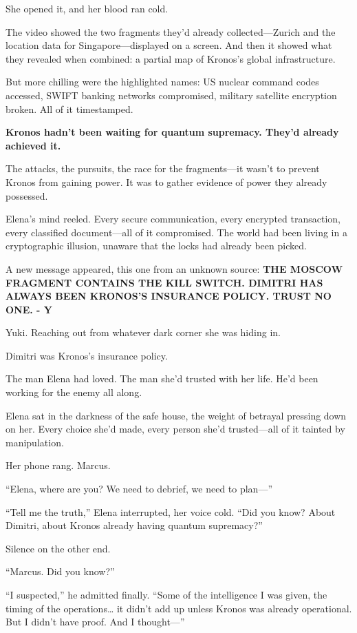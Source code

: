 She opened it, and her blood ran cold.

The video showed the two fragments they'd already collected---Zurich and the location data for Singapore---displayed on a screen. And then it showed what they revealed when combined: a partial map of Kronos's global infrastructure.

But more chilling were the highlighted names: US nuclear command codes accessed, SWIFT banking networks compromised, military satellite encryption broken. All of it timestamped.

\textbf{Kronos hadn't been waiting for quantum supremacy. They'd already achieved it.}

The attacks, the pursuits, the race for the fragments---it wasn't to prevent Kronos from gaining power. It was to gather evidence of power they already possessed.

Elena's mind reeled. Every secure communication, every encrypted transaction, every classified document---all of it compromised. The world had been living in a cryptographic illusion, unaware that the locks had already been picked.

A new message appeared, this one from an unknown source: \textbf{THE MOSCOW FRAGMENT CONTAINS THE KILL SWITCH. DIMITRI HAS ALWAYS BEEN KRONOS'S INSURANCE POLICY. TRUST NO ONE. - Y}

Yuki. Reaching out from whatever dark corner she was hiding in.

Dimitri was Kronos's insurance policy.

The man Elena had loved. The man she'd trusted with her life. He'd been working for the enemy all along.

Elena sat in the darkness of the safe house, the weight of betrayal pressing down on her. Every choice she'd made, every person she'd trusted---all of it tainted by manipulation.

Her phone rang. Marcus.

``Elena, where are you? We need to debrief, we need to plan---''

``Tell me the truth,'' Elena interrupted, her voice cold. ``Did you know? About Dimitri, about Kronos already having quantum supremacy?''

Silence on the other end.

``Marcus. Did you know?''

``I suspected,'' he admitted finally. ``Some of the intelligence I was given, the timing of the operations\ldots{} it didn't add up unless Kronos was already operational. But I didn't have proof. And I thought---''

